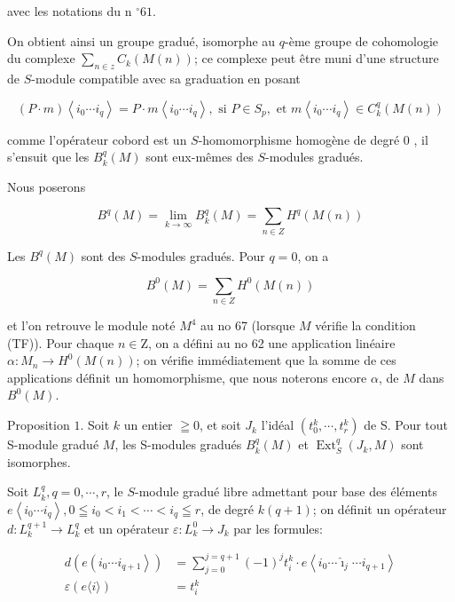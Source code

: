 avec les notations du n $^{\circ} 61$.

On obtient ainsi un groupe gradué, isomorphe au $q$-ème groupe de cohomologie du complexe $\sum_{n \in z} C_{k}(M(n))$; ce complexe peut être muni d'une structure de $S$-module compatible avec sa graduation en posant

$$
(P \cdot m)\left\langle i_{0} \cdots i_{q}\right\rangle=P \cdot m\left\langle i_{0} \cdots i_{q}\right\rangle, \text { si } P \in S_{p}, \text { et } m\left\langle i_{0} \cdots i_{q}\right\rangle \in C_{k}^{q}(M(n))
$$

comme l'opérateur cobord est un $S$-homomorphisme homogène de degré 0 , il s'ensuit que les $B_{k}^{q}(M)$ sont eux-mêmes des $S$-modules gradués.

Nous poserons

$$
B^{q}(M)=\lim _{k \rightarrow \infty} B_{k}^{q}(M)=\sum_{n \in Z} H^{q}(M(n))
$$

Les $B^{q}(M)$ sont des $S$-modules gradués. Pour $q=0$, on a

$$
B^{0}(M)=\sum_{n \in Z} H^{0}(M(n))
$$

et l'on retrouve le module noté $M^{4}$ au no 67 (lorsque $M$ vérifie la condition (TF)). Pour chaque $n \in \mathrm{Z}$, on a défini au no 62 une application linéaire $\alpha: M_{n} \rightarrow H^{0}(M(n))$; on vérifie immédiatement que la somme de ces applications définit un homomorphisme, que nous noterons encore $\alpha$, de $M$ dans $B^{0}(M)$.

Proposition $1 .$ Soit $k$ un entier $\geqq 0$, et soit $J_{k}$ l'idéal $\left(t_{0}^{k}, \cdots, t_{r}^{k}\right)$ de S. Pour tout S-module gradué $M$, les S-modules gradués $B_{k}^{q}(M)$ et $\operatorname{Ext}_{S}^{q}\left(J_{k}, M\right)$ sont isomorphes.

Soit $L_{k}^{q}, q=0, \cdots, r$, le $S$-module gradué libre admettant pour base des éléments $e\left\langle i_{0} \cdots i_{q}\right\rangle, 0 \leqq i_{0}<i_{1}<\cdots<i_{q} \leqq r$, de degré $k(q+1)$; on définit un opérateur $d: L_{k}^{q+1} \rightarrow L_{k}^{q}$ et un opérateur $\varepsilon: L_{k}^{0} \rightarrow J_{k}$ par les formules:

$$
\begin{aligned}
    d\left(e\left(i_{0} \cdots i_{q+1}\right\rangle\right) &=\sum_{j=0}^{j=q+1}(-1)^{j} t_{i}^{k} \cdot e\left\langle i_{0} \cdots \hat{\imath}_{j} \cdots i_{q+1}\right\rangle \\
    \varepsilon(e\langle i\rangle) &=t_{i}^{k}
\end{aligned}
$$

